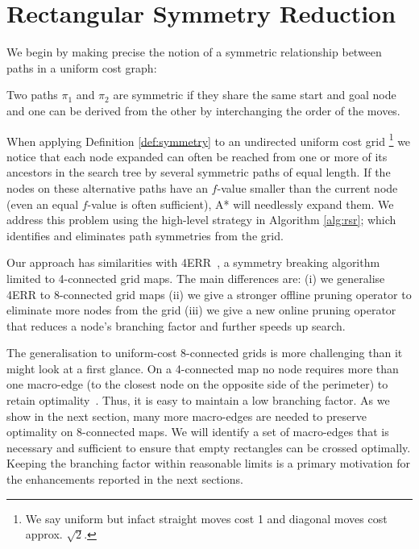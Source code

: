 \section{Rectangular Symmetry Reduction}
\label{sec:rsr}

We begin by making precise the notion of a symmetric relationship between paths
in a uniform cost graph:
\begin{definition}
\label{def:symmetry}
Two paths $\pi_{1}$ and $\pi_{2}$ are symmetric if they share the same start and
goal node and one can be derived from the other by interchanging the order of the
moves.
\end{definition}

When applying Definition \ref{def:symmetry} to an undirected uniform cost grid 
\footnote{We say uniform but infact straight moves cost 1 and diagonal
moves cost approx. $\sqrt{2}$.} we notice that each node expanded can
often be reached from one or more of its ancestors in the search tree by several 
symmetric paths of equal length.
If the nodes on these alternative paths have an $f$-value smaller than the
current node (even an equal $f$-value is often sufficient), A* will needlessly
expand them.  
We address this problem using the high-level strategy in Algorithm
\ref{alg:rsr}; which identifies and eliminates path symmetries from the grid.



Our approach has similarities with 4ERR~\cite{harabor10}, a symmetry breaking algorithm 
limited to 4-connected grid maps.
The main differences are: (i) we generalise 4ERR to 8-connected grid maps 
(ii) we give a stronger offline pruning operator to eliminate more nodes from
the grid (iii) we give a new online pruning operator that reduces a node's branching
factor and further speeds up search.

The generalisation to uniform-cost 8-connected grids is more challenging than it might look
at a first glance.  On a 4-connected map no node requires more than one
macro-edge (to the closest node on the opposite side of the perimeter) to retain
optimality~\cite{harabor10}.  Thus, it is easy to maintain a low branching
factor.
As we show in the next section, many more macro-edges are
needed to preserve optimality on 8-connected maps. We will identify a set of
macro-edges that is necessary and sufficient to ensure that empty rectangles can
be crossed optimally.  Keeping the branching factor within reasonable limits is
a primary motivation for the enhancements reported in the next sections.


